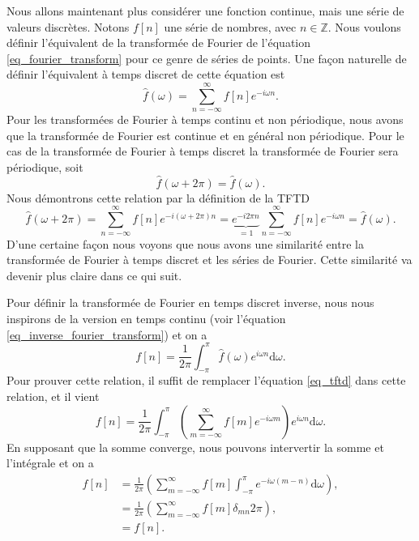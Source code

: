 \documentclass[a4paper,12pt]{book}
\newcommand{\integer}{\mathbb{Z}}
\newcommand{\dd}{\mathrm{d}}
\newcommand{\fh}{\hat{f}}
\begin{document}
Nous allons maintenant plus considérer une fonction continue, mais une série de valeurs discrètes.
Notons $f[n]$ une série de nombres, avec $n\in\integer$. Nous voulons définir l'équivalent de la transformée 
de Fourier de l'équation \eqref{eq_fourier_transform} pour ce genre de séries de points. Une façon naturelle 
de définir l'équivalent à temps discret de cette équation est 
\begin{equation}
 \fh(\omega)=\sum_{n=-\infty}^\infty f[n] e^{-i\omega n}.\label{eq_tftd}
\end{equation}
Pour les transformées de Fourier à temps continu et non périodique, nous avons que la transformée de Fourier
est continue et en général non périodique. Pour le cas de la transformée de Fourier à temps discret
la transformée de Fourier sera périodique, soit
\begin{equation}
 \fh(\omega+2\pi)=\fh(\omega).
\end{equation}
Nous démontrons cette relation par la définition de la TFTD
\begin{equation}
 \fh(\omega+2\pi)=\sum_{n=-\infty}^\infty f[n] e^{-i(\omega+2\pi) n}=\underbrace{e^{-i2\pi n}}_{=1}\sum_{n=-\infty}^\infty f[n] e^{-i\omega n}=\fh(\omega).
\end{equation}
D'une certaine façon nous voyons que nous avons une similarité entre la transformée de Fourier à temps discret et les séries de Fourier.
Cette similarité va devenir plus claire dans ce qui suit.

Pour définir la transformée de Fourier en temps discret inverse, nous nous inspirons de la version
en temps continu (voir l'équation \eqref{eq_inverse_fourier_transform}) et on a 
\begin{equation}
 f[n]=\frac{1}{2\pi}\int_{-\pi}^\pi\fh(\omega)e^{i\omega n}\dd \omega. \label{eq_tftdi}
\end{equation}
Pour prouver cette relation, il suffit de remplacer l'équation \eqref{eq_tftd} dans cette relation,
et il vient
\begin{equation}
 f[n]=\frac{1}{2\pi}\int_{-\pi}^\pi \left(\sum_{m=-\infty}^\infty f[m] e^{-i\omega m}\right) e^{i\omega n}\dd \omega.
\end{equation}
En supposant que la somme converge, nous pouvons intervertir la somme et l'intégrale et on a
\begin{align}
 f[n]&=\frac{1}{2\pi}\left(\sum_{m=-\infty}^\infty f[m] \int_{-\pi}^\pi e^{-i\omega (m-n)} \dd \omega\right),\nonumber\\
     &=\frac{1}{2\pi}\left(\sum_{m=-\infty}^\infty f[m] \delta_{mn} 2\pi\right),\nonumber\\
     &=f[n].\nonumber
\end{align}
\end{document}
